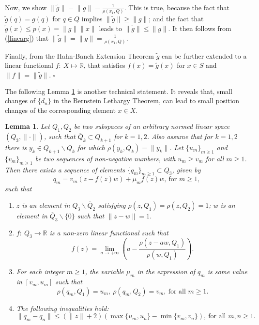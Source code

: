 \documentclass[12pt, reqno]{amsart}
\newtheorem{lemma}[theorem]{Lemma}
\theoremstyle{definition}
\theoremstyle{remark}
\numberwithin{equation}{section}
\begin{document}
 Now, we show $\|\tilde g\|=\|g\|=\displaystyle \frac{1}{\rho(x_1,Q)}$. This is true, because  the fact that $\tilde g(q)=g(q)$ for $q\in Q$ implies $\|\tilde g\|\ge\|g\|$; and the fact that $\tilde g(x)\le p(x)=\|g\|\|x\|$ leads to $\|\tilde g\|\le \|g\|$. It then follows from (\ref{linearg}) that $\|\tilde g\|=\|g\|=\displaystyle \frac{1}{\rho(x_1,Q)}$.

 Finally, from the Hahn-Banch Extension Theorem $\tilde g$ can be further extended to a linear functional $f:~X\longmapsto \mathbb R$, that satisfies $f(x)=\tilde g(x)$ for $x\in S$ and $\|f\|=\|\tilde g\|$.  $\square$

  The following Lemma \ref{lemma2} is another technical statement. It reveals that, small changes of  $\{d_n\}$ in the Bernstein Lethargy Theorem,  can lead to small position changes of the corresponding element $x\in X$.
 \begin{lemma}
 \label{lemma2}
 Let $Q_1,Q_2$ be two subspaces of an arbitrary normed linear space $(Q_3,\|\cdot\|)$, such that $\overline Q_k\subset Q_{k+1}$ for $k=1,2$. Also assume that for $k=1,2$ there is $y_k\in Q_{k+1}\backslash  Q_k$ for which $\rho(y_k,Q_k)=\|y_k\|$. Let $\{u_m\}_{m\ge1}$ and $\{v_m\}_{m\ge1}$ be two sequences of non-negative numbers, with $u_m\ge v_m$ for all $m\ge1$. Then there exists a sequence of elements  $\{q_m\}_{m\ge1}\subset Q_{3}$, given by
$$
q_{m}=v_m(z-f(z)w)+\mu_mf(z)w,~\mbox{for $m\ge1$},
$$
such that
\begin{enumerate}
\renewcommand{\labelenumi}{\alph{enumi})}
\item [(i)]$z$ is an element in $Q_3\backslash \overline Q_2$ satisfying $\rho(z,Q_1)=\rho(z,Q_2)=1$; $w$ is an element in $\overline Q_3\backslash\{0\}$ such that $\|z-w\|=1$.
    \item[(ii)] $f:~Q_3\rightarrow \mathbb R$ is a non-zero linear functional such that 
    $$
    f(z)=\lim_{a\to+\infty}\left(a-\frac{\rho(z-aw,Q_1)}{\rho(w,Q_1)}\right).
    $$
    \item[(iii)] For each integer $m\ge1$, the variable $\mu_m$ in the expression of $q_m$ is some value in $[v_m,u_m]$ such that
     \begin{equation}
 \label{q}
 \rho(q_m,Q_1)=u_m,~\rho(q_m,Q_2)=v_m,~\mbox{for all $m\ge1$}.
 \end{equation}
    \item[(iv)] The following inequalities hold:
 \begin{equation}
 \label{diffq1}
 \|q_m-q_n\|\le (\|z\|+2)\left(\max\{u_m,u_n\}-\min\{v_m,v_n\}\right),~\mbox{for all $m,n\ge1$}.
 \end{equation}
\end{enumerate}
 \end{lemma}
\end{document}
